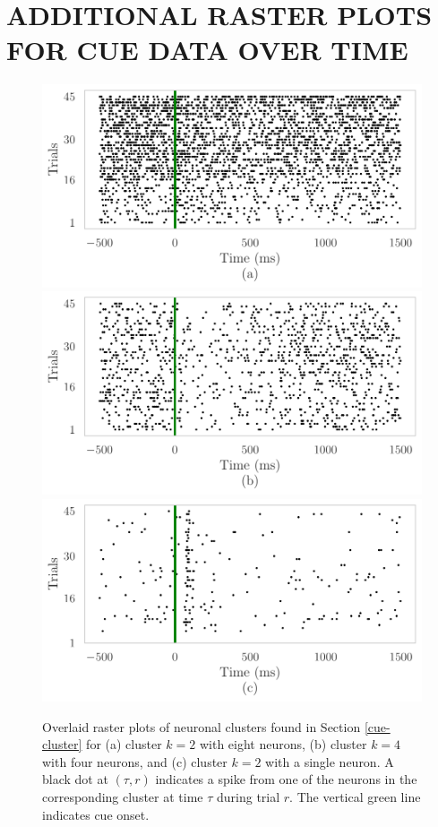 \documentclass[twoside]{article}
\begin{document}
\section{ADDITIONAL RASTER PLOTS FOR CUE DATA OVER TIME} \label{raster-plots}
\begin{figure}[h]
\begin{center}
\includegraphics[scale=0.5]{../img/cue-raster-appa.pdf}
\includegraphics[scale=0.5]{../img/cue-raster-appb.pdf}
\includegraphics[scale=0.5]{../img/cue-raster-appc.pdf}
\end{center}
\vspace{-4mm}
\caption{Overlaid raster plots of neuronal clusters found in Section \ref{cue-cluster} for (a) cluster $k =2$ with eight neurons, (b) cluster $k = 4$ with four neurons, and (c) cluster $k = 2$ with a single neuron.  A black dot at $(\tau, r)$ indicates a spike from one of the neurons in the corresponding cluster at time $\tau$ during trial $r$. The vertical green line indicates cue onset.} \label{cue-rasters}
\end{figure}
\end{document}
